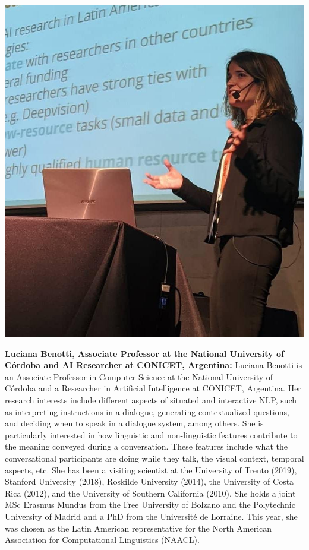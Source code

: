 \vspace{1em}
\begin{center}
\includegraphics[width=0.3\linewidth]{content/mexican_nlp/luciana.jpg}
\end{center}
{\bfseries Luciana Benotti, Associate Professor at the National University of Córdoba and AI Researcher at CONICET, Argentina:}
Luciana Benotti is an Associate Professor in Computer Science at the National University of C\'ordoba and a Researcher in Artificial Intelligence at CONICET, Argentina. Her research interests include different aspects of situated and interactive NLP, such as interpreting instructions in a dialogue, generating contextualized questions, and deciding when to speak in a dialogue system, among others. She is particularly interested in how linguistic and non-linguistic features contribute to the meaning conveyed during a conversation. These features include what the conversational participants are doing while they talk, the visual context, temporal aspects, etc. She has been a visiting scientist at the University of Trento (2019), Stanford University (2018), Roskilde University (2014), the University of Costa Rica (2012), and the University of Southern California (2010). She holds a joint MSc Erasmus Mundus from the Free University of Bolzano and the Polytechnic University of Madrid and a PhD from the Université de Lorraine. This year, she was chosen as the Latin American representative for the North American Association for Computational Linguistics (NAACL).

